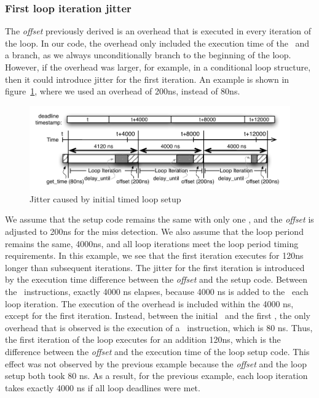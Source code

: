 \subsubsection{First loop iteration jitter}
The \emph{offset} previously derived is an overhead that is executed in every iteration of the loop.
In our code, the overhead only included the execution time of the \delayuntil\ and a branch, as we always unconditionally branch to the beginning of the loop. 
However, if the overhead was larger, for example, in a conditional loop structure, then it could introduce jitter for the first iteration.
An example is shown in figure~\ref{fig:setup_look_timing}, where we used an overhead of 200ns, instead of 80ns.
\begin{figure}[h]
  \vspace{-3mm}
  \begin{center}
    \includegraphics[scale=.9]{figs/setup_loop_timing}
  \end{center}
  \vspace{-3mm}
  \caption{Jitter caused by initial timed loop setup}
  \label{fig:setup_look_timing}
\end{figure}
We assume that the setup code remains the same with only one \gettime, and the \emph{offset} is adjusted to 200ns for the miss detection.
We also assume that the loop periond remains the same, 4000ns, and all loop iterations meet the loop period timing requirements. 
In this example, we see that the first iteration executes for 120ns longer than subsequent iterations.
The jitter for the first iteration is introduced by the execution time difference between the \emph{offset} and the setup code.  
Between the \delayuntil\ instructions, exactly 4000 ns elapses, because 4000 ns is added to the \deadlinet\ each loop iteration.   
The execution of the overhead is included within the 4000 ns, except for the first iteration. 
Instead, between the initial \deadlinet\ and the first \delayuntil, the only overhead that is observed is the execution of a \gettime\ instruction, which is 80 ns. 
Thus, the first iteration of the loop executes for an addition 120ns, which is the difference between the \emph{offset} and the execution time of the loop setup code.
This effect was not observed by the previous example because the \emph{offset} and the loop setup both took 80 ns.
As a result, for the previous example, each loop iteration takes exactly 4000 ns if all loop deadlines were met.   

